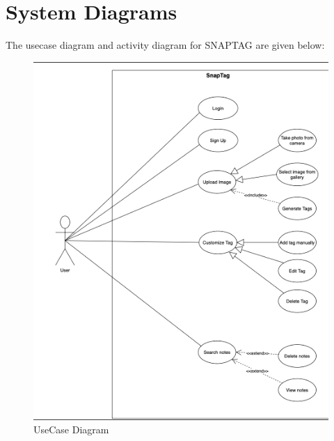 \section{System Diagrams}
The usecase diagram and activity diagram for SNAPTAG are given below:
\begin{figure}[h!]
    \centering
        \includegraphics[scale=0.7]{output/usecase.png}
        \caption{UseCase Diagram}%
    \end{figure}
\newpage
